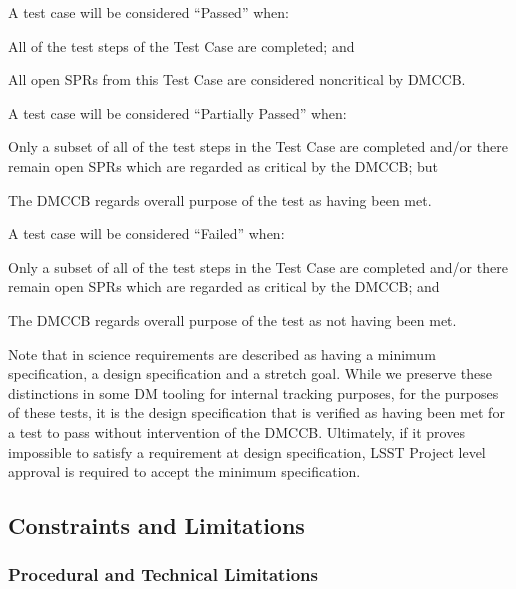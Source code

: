 A test case will be considered ``Passed'' when:

\begin{itemize_single}
\item{All of the test steps of the Test Case are completed; and}
\item{All open SPRs from this Test Case are considered noncritical by DMCCB.}
\end{itemize_single}

A test case will be considered ``Partially Passed'' when:

\begin{itemize_single}
\item{Only a subset of all of the test steps in the Test Case are completed and/or there remain open SPRs which are regarded as critical by the DMCCB; but}
\item{The DMCCB regards overall purpose of the test as having been met.}
\end{itemize_single}

A test case will be considered ``Failed'' when:

\begin{itemize_single}
\item{Only a subset of all of the test steps in the Test Case are completed and/or there remain open SPRs which are regarded as critical by the DMCCB; and}
\item{The DMCCB regards overall purpose of the test as not having been met.}
\end{itemize_single}

Note that in  science requirements are described as having a minimum specification, a design specification and a stretch goal.
While we preserve these distinctions in some DM tooling for internal tracking purposes, for the purposes of these tests, it is the design specification that is verified as having been met for a test to pass without intervention of the DMCCB.
Ultimately, if it proves impossible to satisfy a requirement at design specification, LSST Project level approval is required to accept the minimum specification.

\subsection{Constraints and Limitations}

\subsubsection{Procedural and Technical Limitations}

